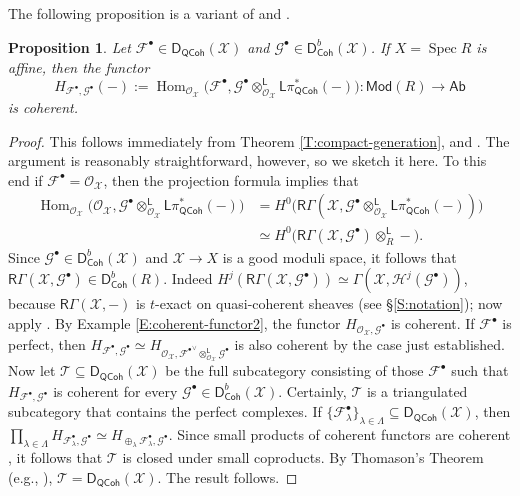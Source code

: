 \documentclass[a4paper]{amsart}
\theoremstyle{plain}
\newtheorem{proposition}[theorem]{Proposition}
\theoremstyle{definition}
\theoremstyle{remark}
\numberwithin{equation}{section}
\newcommand\cH{\mathcal{H}}
\newcommand\cX{\mathcal{X}}
\newcommand\oh{\mathcal{O}}
\newcommand\Coh{\mathsf{Coh}}
\newcommand\Mod{\mathsf{Mod}}
\newcommand\Ab{\mathsf{Ab}}
\DeclareMathOperator{\Spec}{Spec}
\newcommand{\tensor}{\otimes}
\newcommand{\QCoh}{\mathsf{QCoh}}
\newcommand{\DCAT}{\mathsf{D}}
\newcommand{\DQCOH}{\DCAT_{\QCoh}}
\DeclareMathOperator{\Hom}{Hom}
\newcommand{\DERF}[1]{\mathsf{{#1}}}
\newcommand{\RDERF}{\DERF{R}}
\newcommand{\LDERF}{\DERF{L}}
\newcommand{\shv}[1]{\mathcal{{#1}}}
\newcommand{\cplx}[1]{\shv{{#1}}^\bullet}
\newcommand{\QCPBK}[1]{\LDERF {#1}^*_{\QCoh}}
\begin{document}
The following proposition is a variant of \cite[Thm.~C]{hallj_coho_bc} and \cite[Thm.~D]{perfect_complexes_stacks}.
\begin{proposition}\label{P:coh_gms}
  Let $\cplx{F} \in \DQCOH(\cX)$ and $\cplx{G} \in \DCAT_{\Coh}^b(\cX)$. If $X=\Spec R$ is affine, then the 
  functor
  \[
    H_{\cplx{F},\cplx{G}}(-):=\Hom_{\oh_{\cX}}\bigl(\cplx{F},\cplx{G} \tensor_{\oh_\cX}^{\LDERF} \QCPBK{\pi}(-)\bigr) \colon \Mod(R) \to \Ab
  \]
  is coherent.
\end{proposition}
\begin{proof}
  This follows immediately from Theorem \ref{T:compact-generation},
  \cite[Thm.~4.16(x)]{alper-good} and
  \cite[Cor.~4.19]{perfect_complexes_stacks}. The argument is
  reasonably straightforward, however, so we sketch it here.  To this end if 
  $\cplx{F} = \oh_{\cX}$, then the projection formula
  \cite[Prop.~4.11]{perfect_complexes_stacks} implies that
  \begin{align*}
    \Hom_{\oh_{\cX}}\bigl(\oh_{\cX},\cplx{G} \tensor_{\oh_\cX}^{\LDERF} \QCPBK{\pi}(-)\bigr) &= H^0\bigl(\RDERF \Gamma(\cX,\cplx{G} \tensor_{\oh_\cX}^{\LDERF} \QCPBK{\pi}(-))\bigr)\\
    &\simeq H^0\bigl(\RDERF \Gamma(\cX,\cplx{G}) \tensor_{R}^{\LDERF} - \bigr).
  \end{align*}
  Since $\cplx{G} \in \DCAT_{\Coh}^b(\cX)$ and $\cX \to X$ is a good
  moduli space, it follows that
  $\RDERF \Gamma(\cX,\cplx{G}) \in \DCAT^b_{\Coh}(R)$. Indeed
  $H^j(\RDERF \Gamma(\cX,\cplx{G})) \simeq
  \Gamma(\cX,\cH^j(\cplx{G}))$, because $\RDERF\Gamma(\cX,-)$ is $t$-exact on
  quasi-coherent sheaves (see \S\ref{S:notation}); now apply \cite[Thm.~4.16(x)]{alper-good}. By Example \ref{E:coherent-functor2}, the
  functor $H_{\oh_{\cX},\cplx{G}}$ is coherent. If $\cplx{F}$ is
  perfect, then
  $H_{\cplx{F},\cplx{G}} \simeq H_{\oh_{\cX},{\cplx{F}}^\vee
    \tensor^{\LDERF}_{\oh_{\cX}} \cplx{G}}$ is also coherent by the
  case just established. Now let $\mathcal{T} \subseteq \DQCOH(\cX)$
  be the full subcategory consisting of those $\cplx{F}$ such that
  $H_{\cplx{F},\cplx{G}}$ is coherent for every
  $\cplx{G} \in \DCAT^b_{\Coh}(\cX)$. Certainly, $\mathcal{T}$ is a
  triangulated subcategory that contains the perfect complexes. If
  $\{\cplx{F}_\lambda\}_{\lambda\in \Lambda} \subseteq \DQCOH(\cX)$,
  then
  $\prod_{\lambda\in \Lambda} H_{\cplx{F}_\lambda,\cplx{G}} \simeq
  H_{\oplus_\lambda \cplx{F}_\lambda,\cplx{G}}$. Since small products
  of coherent functors are coherent \cite[Ex.~4.9]{hallj_coho_bc}, it
  follows that $\mathcal{T}$ is closed under small coproducts. By
  Thomason's Theorem (e.g.,
  \cite[Cor.~3.14]{perfect_complexes_stacks}),
  $\mathcal{T} = \DQCOH(\cX)$. The result follows.
\end{proof}
\end{document}

